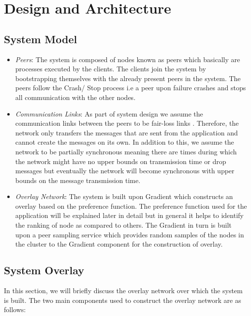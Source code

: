 \documentclass[12pt,a4paper,twoside,openright]{book}
\begin{document}
\chapter{Design and Architecture}
\label{chap:design}

\section{System Model}

\begin{itemize}

\item \textit{Peers}: The system is composed of nodes known as peers which basically are processes executed by the clients. The clients join the system by bootstrapping themselves with the already present peers in the system. The peers follow the Crash/ Stop process \cite{guerraoui} i.e a peer upon failure crashes and stops all communication with the other nodes.  


\item \textit{Communication Links}: As part of system design we assume the communication links between the peers to be fair-loss links \cite{guerraoui}. Therefore, the network only transfers the messages that are sent from the application and cannot create the messages on its own. In addition to this, we assume the network to be partially synchronous meaning there are times during which the network might have no upper bounds on transmission time or drop messages but eventually the network will become synchronous with upper bounds on the message transmission time.

\item \textit{Overlay Network}: The system is built upon Gradient \cite{sacha2006discovery} which constructs an overlay based on the preference function. The preference function used for the application will be explained later in detail but in general it helps to identify the ranking of node as compared to others. The Gradient in turn is built upon a peer sampling service which provides random samples of the nodes in the cluster to the Gradient component for the construction of overlay.

\end{itemize}



\section{System Overlay}
In this section, we will briefly discuss the overlay network over which the system is built. The two main components used to construct the overlay network are as follows: 
\end{document}
